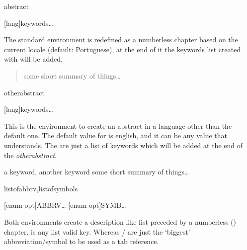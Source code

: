 \documentclass[dctools,english,tocdepth=3,secdepth=3]{ufrgscca} %
\begin{document}
\begin{Envs}{abstract}
	\begin{Syntax}%
		\Macro{\begin{abstract}}[lang]{keywords}\ldots\Macro{\end{abstract}}{}
	\end{Syntax}
	The standard environment  is redefined as a numberless chapter based on the current locale (default: Portuguese), at the end of it the keywords list created with \Macro{\keyword}{} will be added.
\end{Envs}

\begin{stcode}[st=d.abstract]
	\keyword{a keyword}
	\keyword{another keyword}
	\begin{abstract} some short summary of things\ldots
	\end{abstract}
\end{stcode}

\begin{Envs}{otherabstract}
	\begin{Syntax}%
		\Macro{\begin{otherabstract}}[lang]{keywords}\ldots\Macro{\end{otherabstract}}{}
	\end{Syntax}
This is the environment to create an abstract in a language other than the default one.
The default value for  is english, and it can be any value that  understands. The  are just a list of keywords which will be added at the end of the \emph{otherabstract}.
\end{Envs}

\begin{stcode}[st=d.oabstract]
	\begin{otherabstract}[english]{a keyword, another keyword} some short summary of things\ldots
	\end{otherabstract}
\end{stcode}


\begin{Envs}{listofabbrv,listofsymbols}
	\begin{Syntax}%
	\Macro{\begin{listofabbrv}}[enum-opt]{ABBRV}\ldots\Macro{\end{listofabbrv}}{}
	\Macro{\begin{listofsymbols}}[enum-opt]{SYMB}\ldots\Macro{\end{listofsymbols}}{}
	\end{Syntax}
\end{Envs}
Both environments create a description like list preceded by a numberless (\Macro{\nonum}{}) chapter.  is any  list valid key. Whereas  /  are just the `biggest' abbreviation/symbol to be used as a tab reference.
\end{document}
